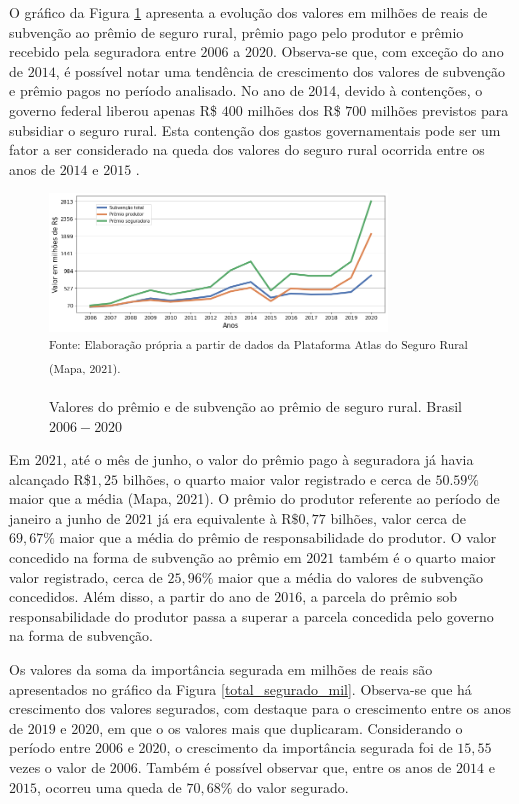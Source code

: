 O gráfico da Figura \ref{soma_ano_values} apresenta a evolução dos valores em milhões de reais de subvenção ao prêmio de seguro rural, prêmio pago pelo produtor e prêmio recebido pela seguradora entre $2006$ a $2020$. Observa-se que, com exceção do ano de $2014$, é possível notar uma tendência de crescimento dos valores de subvenção e prêmio pagos no período analisado. No ano de 2014, devido à contenções, o governo federal liberou apenas R\$ $400$ milhões dos R\$ $700$ milhões previstos para subsidiar o seguro rural. Esta contenção dos gastos governamentais pode ser um fator a ser considerado na queda dos valores do seguro rural ocorrida entre os anos de $2014$ e $2015$ \cite{andrade21}.

\begin{figure}[H]
	\centering
	\caption{Valores do prêmio e de subvenção ao prêmio de seguro rural. Brasil $2006 - 2020$}
	\includegraphics[width=0.8\textwidth]{figuras/soma_ano_values.png}\\
	\small \textsuperscript {Fonte: Elaboração própria a partir de dados da Plataforma Atlas do Seguro Rural (Mapa, 2021).}
    \label{soma_ano_values}
\end{figure}

Em $2021$, até o mês de junho, o valor do prêmio pago à seguradora já havia alcançado R\$$1,25$ bilhões, o quarto maior valor registrado e cerca de $50.59\%$ maior que a média (Mapa, 2021). O prêmio do produtor referente ao período de janeiro a junho de $2021$ já era equivalente à R$\$0,77$ bilhões, valor cerca de $69,67\%$ maior que a média do prêmio de responsabilidade do produtor. O valor concedido na forma de subvenção ao prêmio em $2021$ também é o quarto maior valor registrado, cerca de $25,96\%$ maior que a média do valores de subvenção concedidos. Além disso, a partir do ano de $2016$, a parcela do prêmio sob responsabilidade do produtor passa a superar a parcela concedida pelo governo na forma de subvenção.

Os valores da soma da importância segurada em milhões de reais são apresentados no gráfico da Figura \ref{total_segurado_mil}. Observa-se que há crescimento dos valores segurados, com destaque para o crescimento entre os anos de $2019$ e $2020$, em que o os valores mais que duplicaram. Considerando o período entre $2006$ e $2020$, o crescimento da importância segurada foi de $15,55$ vezes o valor de $2006$. Também é possível observar que, entre os anos de $2014$ e $2015$, ocorreu uma queda de $70,68\%$ do valor segurado.  

